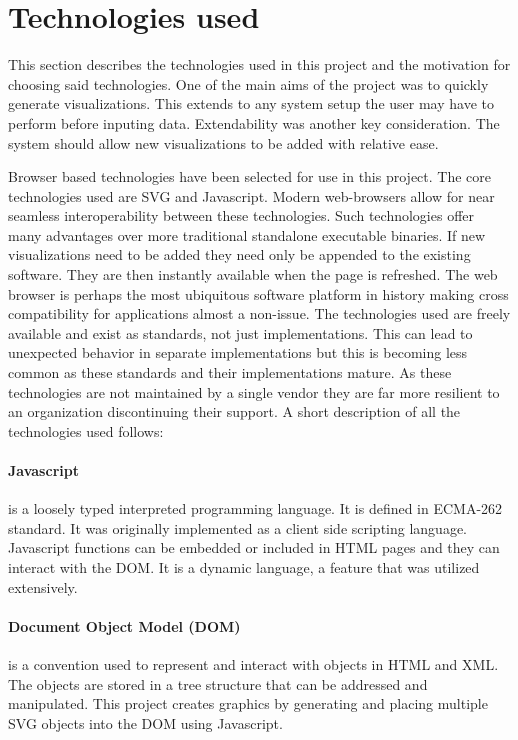 \documentclass[a4paper, 11pt, titlepage, onehalfspacing]{report}
\begin{document}
\section{Technologies used}
This section describes the technologies used in this project and the motivation for choosing said technologies. One of the main aims of the project was to quickly generate visualizations. This extends to any system setup the user may have to perform before inputing data. Extendability was another key consideration. The system should allow new visualizations to be added with relative ease.



Browser based technologies have been selected for use in this project. The core technologies used are SVG and Javascript. Modern web-browsers allow for near seamless interoperability between these technologies. Such technologies offer many advantages over more traditional standalone executable binaries. If new visualizations need to be added they need only be appended to the existing software. They are then instantly available when the page is refreshed. The web browser is perhaps the most ubiquitous software platform in history making cross compatibility for applications almost a non-issue. The technologies used are freely available and exist as standards, not just implementations. This can lead to unexpected behavior in separate implementations but this is becoming less common as these standards and their implementations mature. As these technologies are not maintained by a single vendor they are far more resilient to an organization discontinuing their support. A short description of all the technologies used follows:

\paragraph{Javascript}is a loosely typed interpreted programming language. It is defined in ECMA-262 standard. It was originally implemented as a client side scripting language. Javascript functions can be embedded or included in HTML pages and they can interact with the DOM. It is a dynamic language, a feature that was utilized extensively.

\paragraph{Document Object Model (DOM)}is a convention used to represent and interact with objects in HTML and XML. The objects are stored in a tree structure that can be addressed and manipulated. This project creates graphics by generating and placing multiple SVG objects into the DOM using Javascript.
\end{document}
